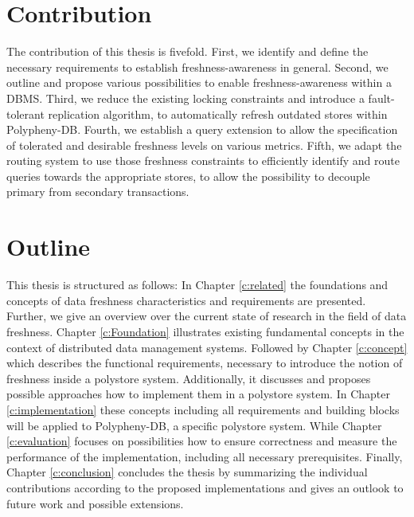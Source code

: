 
\section{Contribution}
The contribution of this thesis is fivefold. First, we identify and define the necessary requirements to establish freshness-awareness in general.
Second, we outline and propose various possibilities to enable freshness-awareness within a DBMS. Third, we reduce the existing locking constraints and 
introduce a fault-tolerant replication algorithm, to automatically refresh outdated stores within Polypheny-DB. 
Fourth, we establish a query extension to allow the specification of tolerated and desirable freshness levels 
on various metrics. Fifth, we adapt the routing system to use those freshness constraints to efficiently identify and route queries towards the appropriate stores, 
to allow the possibility to decouple primary from secondary transactions.




\section{Outline}
This thesis is structured as follows:
In Chapter \ref{c:related} the foundations and concepts of data freshness characteristics and requirements are presented.
Further, we give an overview over the current state of research in the field of data freshness. 
Chapter \ref{c:Foundation} illustrates existing fundamental concepts in the context of distributed data management systems. 
Followed by Chapter \ref{c:concept} which describes the functional requirements, necessary to introduce the notion of freshness inside a polystore system. 
Additionally, it discusses and proposes possible approaches how to implement them in a polystore system. 
In Chapter \ref{c:implementation} these concepts including all requirements and building blocks will be applied to Polypheny-DB, a specific polystore system.
While Chapter \ref{c:evaluation} focuses on possibilities how to ensure correctness and measure the performance of the implementation, including all necessary prerequisites.
Finally, Chapter \ref{c:conclusion} concludes the thesis by summarizing the individual contributions according to the proposed
implementations and gives an outlook to future work and possible extensions.


